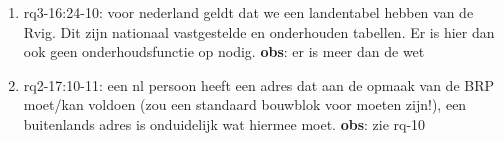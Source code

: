\begin{enumerate}
    \item rq3-16:24-10: voor nederland geldt dat we een landentabel hebben van de Rvig. Dit zijn nationaal vastgestelde en onderhouden tabellen. Er is hier dan ook geen onderhoudsfunctie op nodig.
     \newline\textbf{obs}: er is meer dan de wet
     
    \item rq2-17:10-11: een nl persoon heeft een adres dat aan de opmaak van de BRP moet/kan voldoen (zou een standaard bouwblok voor moeten zijn!), een buitenlands adres is onduidelijk wat hiermee moet.    
     \newline\textbf{obs}: zie rq-10
\end{enumerate}